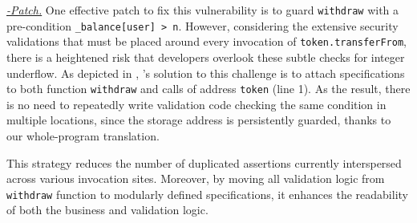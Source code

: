 \smallskip
\noindent
\underline{\textit{\lang-Patch.}}
One effective patch to fix this vulnerability is to guard \texttt{withdraw} with
a pre-condition \texttt{\_balance[user] > n}.
However, considering the extensive security validations that must be placed 
around every invocation of \texttt{token.transferFrom},
there is a heightened risk that developers overlook these subtle 
checks for integer underflow.
As depicted in , \lang's solution to this challenge is 
to attach specifications to both function \texttt{withdraw} and calls of 
address \texttt{token} (line 1).
As the result, there is no need to repeatedly write validation code
checking the same condition in multiple locations, since the storage address is persistently guarded, thanks to our whole-program translation.  

This strategy reduces the number of duplicated assertions 
currently interspersed across various invocation sites.
Moreover, by moving all validation logic from \texttt{withdraw} function 
to modularly defined specifications, it enhances the readability of both the business and validation logic.





% 




